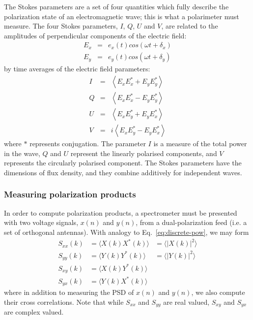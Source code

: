 \documentclass{ws-rv961x669}
\begin{document}
The Stokes parameters are a set of four quantities which fully describe the polarization state of an electromagnetic wave; this is what a polarimeter must measure. The four Stokes parameters, $I$, $Q$, $U$ and $V$, are related to the amplitudes of perpendicular components of the electric field:
\begin{eqnarray}
E_{x} & = & e_{x}(t)cos(\omega t+\delta_{x})\\
E_{y} & = & e_{y}(t)cos(\omega t+\delta_{y})
\end{eqnarray}
by time averages of the electric field parameters:
\begin{eqnarray}
I & = & \left\langle E_{x}E_{x}^{*}+E_{y}E_{y}^{*}\right\rangle \\
Q & = & \left\langle E_{x}E_{x}^{*}-E_{y}E_{y}^{*}\right\rangle \\
U & = & \left\langle E_{x}E_{y}^{*}+E_{y}E_{x}^{*}\right\rangle \\
V & = & i\left\langle E_{x}E_{y}^{*}-E_{y}E_{x}^{*}\right\rangle 
\end{eqnarray}
where $*$ represents conjugation. The parameter $I$ is a measure of the total power in the wave, $Q$ and $U$ represent the linearly polarised components, and $V$ represents the circularly polarised component. The Stokes parameters have the dimensions of flux density, and they combine additively for independent waves.

\subsubsection{Measuring polarization products}

In order to compute polarization products, a spectrometer must be presented with two voltage signals, $x(n)$ and $y(n)$, from a dual-polarization feed (i.e. a set of orthogonal antennas). With analogy to Eq.~\ref{eq:discrete-pow}, we may form 
\begin{eqnarray}
S_{xx}(k) & =  \langle X(k)X^*(k)\rangle  & = \langle |X(k)|^2\rangle \label{eq:sxx1} \\
S_{yy}(k) & =  \langle Y(k)Y^*(k)\rangle  & = \langle |Y(k)|^2\rangle \\
S_{xy}(k) & =  \langle X(k)Y^*(k)\rangle  & \\
S_{yx}(k) & =  \langle Y(k)X^*(k)\rangle  & \label{eq:sxx4}
\end{eqnarray}
where in addition to measuring the PSD of $x(n)$ and $y(n)$, we also compute their cross correlations.  Note that while $S_{xx}$ and $S_{yy}$ are real valued, $S_{xy}$ and $S_{yx}$ are complex valued.
\end{document}
